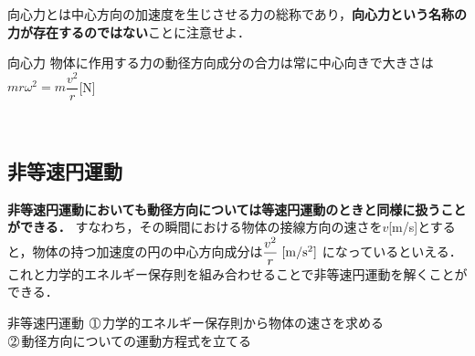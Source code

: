 向心力とは中心方向の加速度を生じさせる力の総称であり，{\bf 向心力という名称の力が存在するのではない}ことに注意せよ．

\begin{matome}{向心力}
 \hspace{5mm} 物体に作用する力の動径方向成分の合力は常に中心向きで大きさは$mr\omega^2=m\dfrac{v^2}{r}$\hspace{1mm}[N]
 \end{matome}
 
 
 \ 
 
%
%

 \subsection{非等速円運動}
 
 {\bf 非等速円運動においても動径方向については等速円運動のときと同様に扱うことができる．}
 すなわち，その瞬間における物体の接線方向の速さを$v$[m/s]とすると，物体の持つ加速度の円の中心方向成分は$\dfrac{v^2}{r}\hspace{1mm}{\rm [m/s^2]}$ になっているといえる．
 これと力学的エネルギー保存則を組み合わせることで非等速円運動を解くことができる．
 
 \begin{matome}{非等速円運動}
 \hspace{5mm} $\MARU{1}$\hspace{2mm}力学的エネルギー保存則から物体の速さを求める\\
 \hspace{5mm} $\MARU{2}$\hspace{2mm}動径方向についての運動方程式を立てる
 \end{matome}
 
